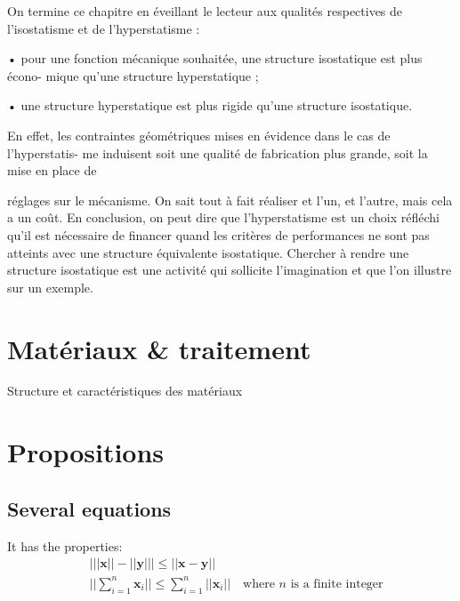 \documentclass[
	11pt, %
	fleqn, %
	a4paper, %
]{LegrandOrangeBook}
\begin{document}
\begin{remark}
    On termine ce chapitre en éveillant le lecteur aux qualités respectives de l’isostatisme
et de l’hyperstatisme :

• pour une fonction mécanique souhaitée, une structure isostatique est plus écono-
mique qu’une structure hyperstatique ;

• une structure hyperstatique est plus rigide qu’une structure isostatique.

En effet, les contraintes géométriques mises en évidence dans le cas de l’hyperstatis-
me induisent soit une qualité de fabrication plus grande, soit la mise en place de

réglages sur le mécanisme. On sait tout à fait réaliser et l’un, et l’autre, mais cela a un
coût. En conclusion, on peut dire que l’hyperstatisme est un choix réfléchi qu’il est
nécessaire de financer quand les critères de performances ne sont pas atteints avec une
structure équivalente isostatique.
Chercher à rendre une structure isostatique est une activité qui sollicite l’imagination
et que l’on illustre sur un exemple.
\end{remark}


\section{Matériaux \& traitement}
\begin{corollary}[S4.1]
Structure et caractéristiques des matériaux
\end{corollary}


\section{Propositions}

\subsection{Several equations}

\begin{proposition}[Proposition name] %
	It has the properties:
	\begin{align}
		& \big| ||\mathbf{x}|| - ||\mathbf{y}|| \big|\leq || \mathbf{x}- \mathbf{y}||\\
		&  ||\sum_{i=1}^n\mathbf{x}_i||\leq \sum_{i=1}^n||\mathbf{x}_i||\quad\text{where $n$ is a finite integer}
	\end{align}
\end{proposition}
\end{document}
